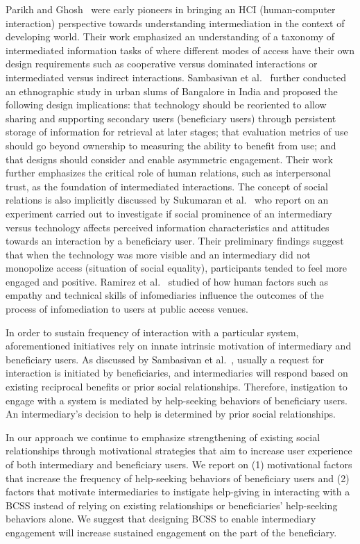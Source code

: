 \documentclass{sig-alternate}
\begin{document}
Parikh and Ghosh~\cite{parikh2006} were early pioneers in bringing an HCI
(human-computer interaction) perspective towards understanding
intermediation in the context of developing world. Their work emphasized an
understanding of a taxonomy of intermediated information tasks of where
different modes of access have their own design requirements such as
cooperative versus dominated interactions or intermediated versus indirect
interactions. Sambasivan et al.~\cite{sambasivan2010} further conducted an
ethnographic study in urban slums of Bangalore in India and proposed the
following design implications: that technology should be reoriented to
allow sharing and supporting secondary users (beneficiary users) through
persistent storage of information for retrieval at later stages; that evaluation
metrics of use should go beyond ownership to measuring the ability to benefit
from use; and that designs should consider and enable asymmetric engagement. 
Their work further emphasizes
the critical role of human relations, such as interpersonal trust, as the foundation
of intermediated interactions. The concept of social relations is also
implicitly discussed by Sukumaran et al.~\cite{sukumaran2009intermediated} who
report on an experiment carried out to investigate if social prominence
of an intermediary versus technology affects perceived information
characteristics and attitudes towards an interaction by a beneficiary user.
Their preliminary findings suggest that when the technology was more visible
and an intermediary did not monopolize access (situation of social equality),
participants tended to feel more engaged and positive. Ramirez et al.~\cite{ramirez2013infomediaries} studied of how human factors such as empathy
and technical skills of infomediaries influence the outcomes of the process of
infomediation to users at public access venues.

In order to sustain frequency of interaction with a particular system,
aforementioned initiatives rely on innate intrinsic motivation of intermediary
and beneficiary users. As discussed by Sambasivan et al.~\cite{sambasivan2010}, usually a request
for interaction is initiated by beneficiaries, and intermediaries will respond
based on existing reciprocal benefits or prior social relationships.
Therefore, instigation to engage with a system is mediated by help-seeking
behaviors of beneficiary users. An intermediary's decision to help is determined
by prior social relationships.

In our approach we continue to emphasize strengthening of existing social
relationships through motivational strategies that aim to increase user
experience of both intermediary and beneficiary users. We report on (1)
motivational factors that increase the frequency of help-seeking behaviors of
beneficiary users and (2) factors that motivate intermediaries to instigate
help-giving in interacting with a BCSS instead of relying on existing
relationships or beneficiaries' help-seeking behaviors alone. 
We suggest that designing BCSS to enable intermediary engagement will 
increase sustained engagement on the part of the beneficiary.
\end{document}
